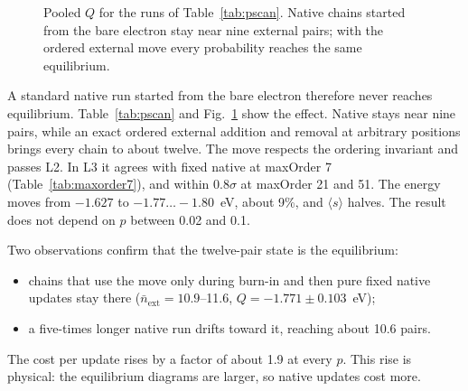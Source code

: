 \documentclass[aps,prb,reprint,superscriptaddress,nofootinbib]{revtex4-2}
\newcommand{\avg}[1]{\langle #1\rangle}
\begin{document}
\begin{figure}
\centering
{}
\caption{\label{fig:pscan}Pooled $Q$ for the runs of Table~\ref{tab:pscan}. Native chains started from the bare electron stay near nine external pairs; with the ordered external move every probability reaches the same equilibrium.}
\end{figure}

A standard native run started from the bare electron therefore never reaches equilibrium. Table~\ref{tab:pscan} and Fig.~\ref{fig:pscan} show the effect. Native stays near nine pairs, while an exact ordered external addition and removal at arbitrary positions brings every chain to about twelve. The move respects the ordering invariant and passes L2. In L3 it agrees with fixed native at maxOrder 7 (Table~\ref{tab:maxorder7}), and within $0.8\sigma$ at maxOrder 21 and 51. The energy moves from $-1.627$ to $-1.77\ldots-1.80$~eV, about 9\%, and $\avg{s}$ halves. The result does not depend on $p$ between 0.02 and 0.1.

Two observations confirm that the twelve-pair state is the equilibrium:
\begin{itemize}
\item chains that use the move only during burn-in and then pure fixed native updates stay there ($\bar n_{\mathrm{ext}}=10.9$--11.6, $Q=-1.771\pm0.103$~eV);
\item a five-times longer native run drifts toward it, reaching about 10.6 pairs.
\end{itemize}
The cost per update rises by a factor of about 1.9 at every $p$. This rise is physical: the equilibrium diagrams are larger, so native updates cost more.
\end{document}
